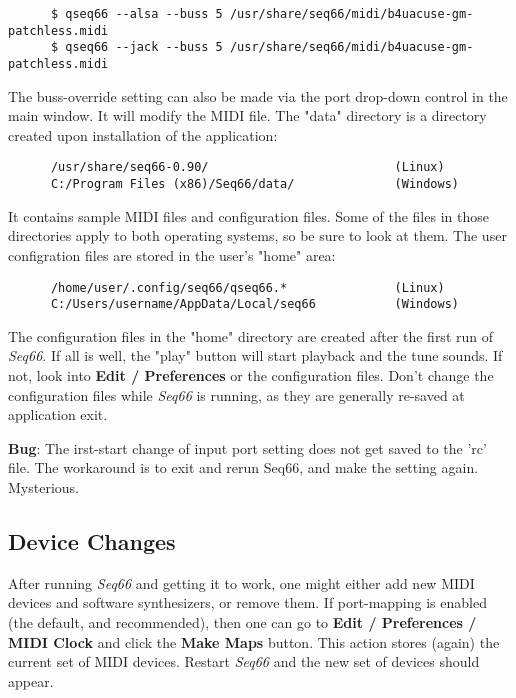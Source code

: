    \begin{verbatim}
      $ qseq66 --alsa --buss 5 /usr/share/seq66/midi/b4uacuse-gm-patchless.midi
      $ qseq66 --jack --buss 5 /usr/share/seq66/midi/b4uacuse-gm-patchless.midi
   \end{verbatim}

   The buss-override setting can also be made via the port drop-down control
   in the main window. It will modify the MIDI file.
   The "data" directory is a directory created upon installation of the
   application:

   \begin{verbatim}
      /usr/share/seq66-0.90/                          (Linux)
      C:/Program Files (x86)/Seq66/data/              (Windows)
   \end{verbatim}

   It contains sample MIDI files and configuration files.
   Some of the files in those directories apply to both operating systems, so
   be sure to look at them.
   The user configration files are stored in the user's "home" area:

   \begin{verbatim}
      /home/user/.config/seq66/qseq66.*               (Linux)
      C:/Users/username/AppData/Local/seq66           (Windows)
   \end{verbatim}

   The configuration files in the "home" directory
   are created after the first run of \textsl{Seq66}.
   If all is well, the "play" button will start playback and the tune sounds.
   If not, look into \textbf{Edit / Preferences} or the configuration files.
   Don't change the configuration files while \textsl{Seq66} is running, as
   they are generally re-saved at application exit.

   \textbf{Bug}:
      The irst-start change of input port setting does not get saved
      to the 'rc' file. The workaround is to exit and rerun Seq66, and
      make the setting again. Mysterious.

\subsection{Device Changes}
\label{subsec:introduction_device_changes}

   After running \textsl{Seq66} and getting it to work, one might
   either add new MIDI devices and software synthesizers, or remove
   them.
   If port-mapping is enabled (the default, and recommended), then
   one can go to
   \textbf{Edit / Preferences / MIDI Clock} and
   click the \textbf{Make Maps} button.
   This action stores (again) the current set of MIDI devices.
   Restart \textsl{Seq66} and the new set of devices should appear.

